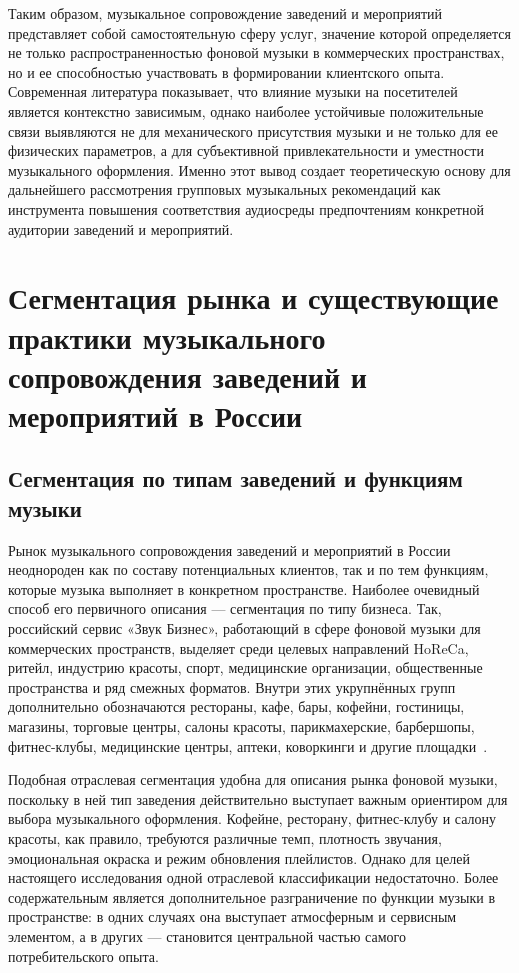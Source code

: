Таким образом, музыкальное сопровождение заведений и мероприятий представляет собой самостоятельную сферу услуг, значение которой определяется не только распространенностью фоновой музыки в коммерческих пространствах, но и ее способностью участвовать в формировании клиентского опыта. Современная литература показывает, что влияние музыки на посетителей является контекстно зависимым, однако наиболее устойчивые положительные связи выявляются не для механического присутствия музыки и не только для ее физических параметров, а для субъективной привлекательности и уместности музыкального оформления. Именно этот вывод создает теоретическую основу для дальнейшего рассмотрения групповых музыкальных рекомендаций как инструмента повышения соответствия аудиосреды предпочтениям конкретной аудитории заведений и мероприятий.

\section{Сегментация рынка и существующие практики музыкального сопровождения заведений и мероприятий в России}
\label{sec:market:segmentation}

\subsection{Сегментация по типам заведений и функциям музыки}

Рынок музыкального сопровождения заведений и мероприятий в России неоднороден как по составу потенциальных клиентов, так и по тем функциям, которые музыка выполняет в конкретном пространстве. Наиболее очевидный способ его первичного описания — сегментация по типу бизнеса. Так, российский сервис «Звук Бизнес», работающий в сфере фоновой музыки для коммерческих пространств, выделяет среди целевых направлений HoReCa, ритейл, индустрию красоты, спорт, медицинские организации, общественные пространства и ряд смежных форматов. Внутри этих укрупнённых групп дополнительно обозначаются рестораны, кафе, бары, кофейни, гостиницы, магазины, торговые центры, салоны красоты, парикмахерские, барбершопы, фитнес-клубы, медицинские центры, аптеки, коворкинги и другие площадки~\cite{zvuk_business_site}.

Подобная отраслевая сегментация удобна для описания рынка фоновой музыки, поскольку в ней тип заведения действительно выступает важным ориентиром для выбора музыкального оформления. Кофейне, ресторану, фитнес-клубу и салону красоты, как правило, требуются различные темп, плотность звучания, эмоциональная окраска и режим обновления плейлистов. Однако для целей настоящего исследования одной отраслевой классификации недостаточно. Более содержательным является дополнительное разграничение по функции музыки в пространстве: в одних случаях она выступает атмосферным и сервисным элементом, а в других — становится центральной частью самого потребительского опыта.

